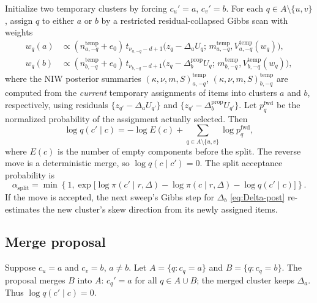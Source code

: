 \documentclass[11pt]{article}
\begin{document}
Initialize two temporary clusters by forcing $c_u'=a$, $c_v'=b$.  For
each $q\in A\setminus\{u,v\}$, assign $q$ to either $a$ or $b$ by a
restricted residual-collapsed Gibbs scan with weights
\begin{align}
    w_q(a)&\propto
    (n_{a,-q}^{\mathrm{temp}}+e_0)\,
    t_{\nu_{a,-q}-d+1}\!\bigl(
        z_q-\Delta_a U_q;\,m_{a,-q}^{\mathrm{temp}},V_{a,-q}^{\mathrm{temp}}(w_q)
    \bigr),
    \label{eq:split-w-a}\\
    w_q(b)&\propto
    (n_{b,-q}^{\mathrm{temp}}+e_0)\,
    t_{\nu_{b,-q}-d+1}\!\bigl(
        z_q-\Delta_b^{\mathrm{prop}} U_q;\,m_{b,-q}^{\mathrm{temp}},V_{b,-q}^{\mathrm{temp}}(w_q)
    \bigr),
    \label{eq:split-w-b}
\end{align}
where the NIW posterior summaries
$(\kappa,\nu,m,S)^{\mathrm{temp}}_{a,-q}$,
$(\kappa,\nu,m,S)^{\mathrm{temp}}_{b,-q}$ are computed from the
\emph{current} temporary assignments of items into clusters $a$ and $b$,
respectively, using residuals
$\{z_{q'}-\Delta_a U_{q'}\}$ and $\{z_{q'}-\Delta_b^{\mathrm{prop}}U_{q'}\}$.
Let $p_q^{\mathrm{fwd}}$ be the normalized probability of the assignment
actually selected.  Then
\begin{equation}
    \log q(c'\mid c)
    =
    -\log E(c)
    +\sum_{q\in A\setminus\{u,v\}}\log p_q^{\mathrm{fwd}},
    \label{eq:split-fwd}
\end{equation}
where $E(c)$ is the number of empty components before the split.  The
reverse move is a deterministic merge, so $\log q(c\mid c')=0$.  The
split acceptance probability is
\begin{equation}
    \alpha_{\mathrm{split}}
    =
    \min\!\left\{1,
    \exp\bigl[
    \log\pi(c'\mid r,\Delta)-\log\pi(c\mid r,\Delta)
    -\log q(c'\mid c)
    \bigr]\right\}.
    \label{eq:split-acc}
\end{equation}
If the move is accepted, the next sweep's Gibbs step for $\Delta_b$
\eqref{eq:Delta-post} re-estimates the new cluster's skew direction from
its newly assigned items.

\subsection{Merge proposal}

Suppose $c_u=a$ and $c_v=b$, $a\neq b$.  Let $A=\{q:c_q=a\}$ and
$B=\{q:c_q=b\}$.  The proposal merges $B$ into $A$:
$c_q'=a$ for all $q\in A\cup B$; the merged cluster keeps $\Delta_a$.
Thus $\log q(c'\mid c)=0$.
\end{document}
